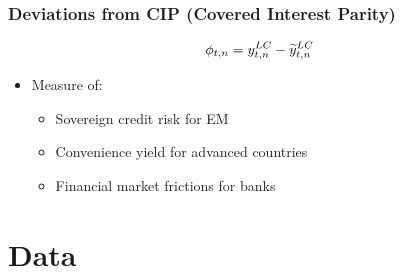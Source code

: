 \documentclass[12pt, aspectratio=169, xcolor=dvipsnames]{beamer}  %
\begin{document}
\begin{frame}[label=DevCIP]
\frametitle{Deviations from CIP (Covered Interest Parity)}
\vspace{-1cm}
\[\phi_{t,n} = y_{t,n} ^{LC} - \widetilde{y}_{t,n} ^{LC}\]
\vspace{-1.2cm}
\begin{itemize}
	\item Measure of:
	\begin{itemize}
		\item Sovereign credit risk for EM \citep{DuSchreger:2016JoF} %
		\item Convenience yield for advanced countries \citep*{DuImSchreger:2018JIE} %
		\item Financial market frictions for banks \citep*{DuTepperVerdelhan:2018} %
	\end{itemize}
\end{itemize}
\end{frame}


\section{Data}
\end{document}
